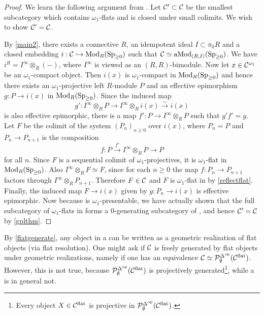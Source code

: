 \documentclass[a4paper,10pt, oneside]{amsart}
\begin{document}
	\begin{proof}
		We learn the following argument from \cite[Lemma 2.4]{quillen1997module}. Let $\mathcal{C}'\subset \mathcal{C}$ be the smallest subcategory which contains $\omega_1$-flats and is closed under small colimits. We wish to show $\mathcal{C}'=\mathcal{C}$.   
		
		By \cref{main2}, there exists a connective \eonering $R$, an idempotent ideal $I\subset \pi_0R$ and a closed embedding $i:\mathcal{C} \hookrightarrow\operatorname{Mod}_{R}(\operatorname{Sp}_{\geq0})$ such that $\mathcal{C}\simeq \operatorname{aMod}_{(R,I)}(\operatorname{Sp}_{\geq0})$. We have $i^R=I^\infty\otimes_R(-)$, where $I^\infty$ is viewed as an $(R,R)$-bimodule. Now let $x\in \mathcal{C}^{\omega_1}$ be an $\omega_1$-compact object. Then $i(x)$ is $\omega_1$-compact in $\operatorname{Mod}_{R}(\operatorname{Sp}_{\geq0})$ and hence there exists an $\omega_1$-projective left $R$-module $P$ and an effective epimorphism $g:P\to i(x)$ in $\operatorname{Mod}_{R}(\operatorname{Sp}_{\geq0})$. 
		Since the induced map $$g':I^\infty \otimes_R P \rightarrow I^\infty \otimes_R i(x) \xrightarrow{\sim} i(x)$$ is also effective epimorphic, there is a map $f': P \rightarrow I^\infty \otimes_R P$ such that $g' f'=g$. Let $F$ be the colimit of the system $\left(P_n\right)_{n \geq 0}$ over $i(x)$, where $P_n=P$ and $P_n \rightarrow P_{n+1}$ is the composition $$f:P\xrightarrow{f'}I^\infty \otimes_R P\to P$$ for all $n$. Since $F$ is a sequential colimit of $\omega_1$-projectives, it is $\omega_1$-flat in $\operatorname{Mod}_{R}(\operatorname{Sp}_{\geq0})$. Also $I^\infty \otimes_R F\simeq F$, since for each $n\geq0$ the map $f:P_n\to P_{n+1}$ factors through $I^\infty \otimes_R P_{n+1}$. Therefore $F\in \mathcal{C}$ and $F$ is $\omega_1$-flat in \mcc by \cref{reflectflat}. Finally, the induced map $F \rightarrow i(x)$ given by $g: P_n \rightarrow i(x)$ is effective epimorphic. Now because \mcc is $\omega_1$-presentable, we have actually shown that the full subcategory of $\omega_1$-flats in \mcc forms a $0$-generating subcategory of \mcc, and hence  $\mathcal{C}'=\mathcal{C}$ by \cref{gplthm}.
	\end{proof}

		\begin{rem}
		By \cref{flatgenerate}, any object in a \dualaddinfcat \mcc can be written as a geometric realization of flat objects (via flat resolution). One might ask if  $\mathcal{C}$ is freely generated by flat objects under geometric realizations, namely if one has an equivalence $\mathcal{C}\simeq \mathcal{P}_{\emptyset}^{\Delta^{\mathrm{op}}}(\mathcal{C}^{\mathrm{flat}})$.
		 However, this is not true, because $\mathcal{P}_{\emptyset}^{\Delta^{\mathrm{op}}}(\mathcal{C}^{\mathrm{flat}})$ is projectively generated\footnote{Every object $X\in \mathcal{C}^{\mathrm{flat}}$ is projective in $\mathcal{P}_{\emptyset}^{\Delta^{\mathrm{op}}}(\mathcal{C}^{\mathrm{flat}})$.}, while a \dualaddinfcat is  in general not. 
	\end{rem}
\end{document}
